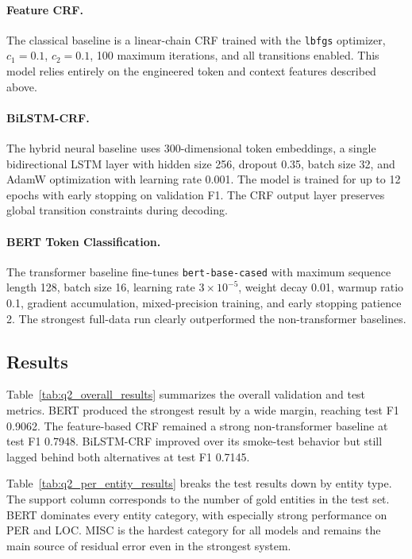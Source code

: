 \paragraph{Feature CRF.}
The classical baseline is a linear-chain CRF \cite{lafferty2001crf} trained with the \texttt{lbfgs} optimizer, \(c_1 = 0.1\), \(c_2 = 0.1\), 100 maximum iterations, and all transitions enabled. This model relies entirely on the engineered token and context features described above.

\paragraph{BiLSTM-CRF.}
The hybrid neural baseline uses 300-dimensional token embeddings, a single bidirectional LSTM layer with hidden size 256, dropout 0.35, batch size 32, and AdamW optimization with learning rate 0.001. The model is trained for up to 12 epochs with early stopping on validation F1. The CRF output layer preserves global transition constraints during decoding.

\paragraph{BERT Token Classification.}
The transformer baseline fine-tunes \nolinkurl{bert-base-cased} \cite{devlin2019bert} with maximum sequence length 128, batch size 16, learning rate \(3 \times 10^{-5}\), weight decay 0.01, warmup ratio 0.1, gradient accumulation, mixed-precision training, and early stopping patience 2. The strongest full-data run clearly outperformed the non-transformer baselines.

\subsection{Results}

Table~\ref{tab:q2_overall_results} summarizes the overall validation and test metrics. BERT produced the strongest result by a wide margin, reaching test F1 0.9062. The feature-based CRF remained a strong non-transformer baseline at test F1 0.7948. BiLSTM-CRF improved over its smoke-test behavior but still lagged behind both alternatives at test F1 0.7145.



Table~\ref{tab:q2_per_entity_results} breaks the test results down by entity type. The support column corresponds to the number of gold entities in the test set. BERT dominates every entity category, with especially strong performance on PER and LOC. MISC is the hardest category for all models and remains the main source of residual error even in the strongest system.


